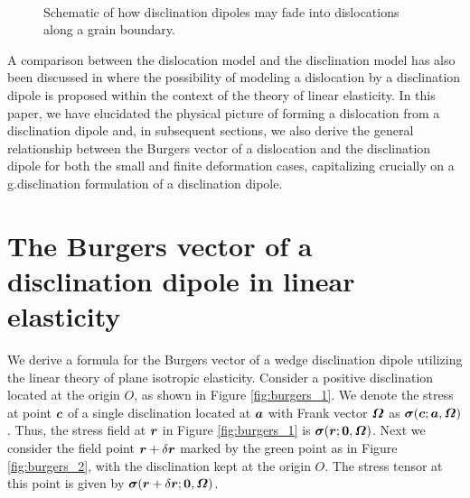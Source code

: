 \documentclass[11pt,letterpaper]{article}
\begin{document}
\begin{figure}
  \centering
  \qquad
   \\
  \qquad
  \caption{Schematic of how disclination dipoles may fade into dislocations along a grain boundary.}
  \label{fig:relation} 
\end{figure}

A comparison between the dislocation model and the disclination model has also been discussed in \cite{li1972disclination} where the possibility of modeling a dislocation by a disclination dipole is proposed within the context of the theory of linear elasticity. In this paper, we have elucidated the physical picture of forming a dislocation from a disclination dipole and, in subsequent sections, we also derive the general relationship between the Burgers vector of a dislocation  and the disclination dipole for  both the 
small and finite deformation cases, capitalizing crucially on a g.disclination formulation of a disclination dipole.

\section{The Burgers vector of a disclination dipole in linear elasticity}\label{sec:burgers_lin}

We derive a formula for the Burgers vector of a wedge disclination dipole utilizing the linear theory of plane isotropic elasticity. Consider a positive disclination located at the origin $O$, as shown in Figure \ref{fig:burgers_1}. We denote the stress at point $\bfc$ of a single disclination located at $\bfa$ with Frank vector $\bfOmega$  as $\bfsigma(\bfc; \bfa, \bfOmega)$. Thus, the stress field at $\bfr$ in Figure \ref{fig:burgers_1} is $\bfsigma(\bfr;\bf0,\bfOmega)$. Next we consider the field point $\bfr+\delta\bfr$ marked by the green point as in Figure \ref{fig:burgers_2}, with the disclination kept at the origin $O$. The stress tensor at this point is given by $\bfsigma(\bfr+\delta\bfr;\bf0,\bfOmega)$.
\end{document}
